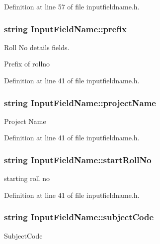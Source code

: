 Definition at line 57 of file inputfieldname.\-h.

\hypertarget{classInputFieldName_a161d155f8faca2c5dea1bbd607b17553}{
\subsubsection[{prefix}]{\setlength{\rightskip}{0pt plus 5cm}string Input\-Field\-Name\-::prefix}}\label{classInputFieldName_a161d155f8faca2c5dea1bbd607b17553}


Roll No details fields. 

Prefix of rollno 

Definition at line 41 of file inputfieldname.\-h.

\hypertarget{classInputFieldName_ab93b034743570810afe89aea88a7bbf6}{
\subsubsection[{project\-Name}]{\setlength{\rightskip}{0pt plus 5cm}string Input\-Field\-Name\-::project\-Name}}\label{classInputFieldName_ab93b034743570810afe89aea88a7bbf6}
Project Name 

Definition at line 41 of file inputfieldname.\-h.

\hypertarget{classInputFieldName_a24baf5c915b4ee0fb8678e03adec043a}{
\subsubsection[{start\-Roll\-No}]{\setlength{\rightskip}{0pt plus 5cm}string Input\-Field\-Name\-::start\-Roll\-No}}\label{classInputFieldName_a24baf5c915b4ee0fb8678e03adec043a}
starting roll no 

Definition at line 41 of file inputfieldname.\-h.

\hypertarget{classInputFieldName_af1cc6871c33344c365e6e25ea482bd48}{
\subsubsection[{subject\-Code}]{\setlength{\rightskip}{0pt plus 5cm}string Input\-Field\-Name\-::subject\-Code}}\label{classInputFieldName_af1cc6871c33344c365e6e25ea482bd48}
Subject\-Code 


